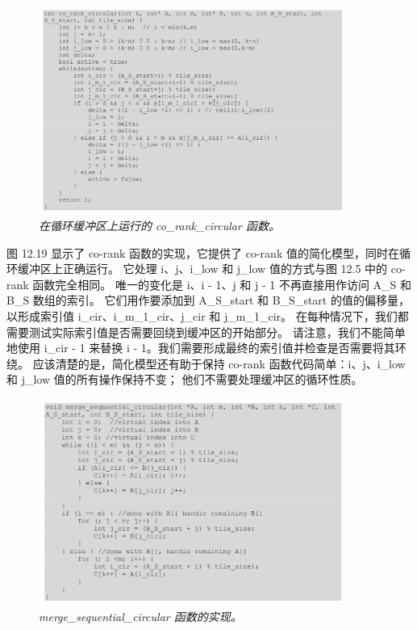 \begin{figure}[H]
	\centering
	\includegraphics[width=0.9\textwidth]{figs/F12.19.png}
	\caption{\textit{在循环缓冲区上运行的 co\_rank\_circular 函数。}}
\end{figure}

图 12.19 显示了 co-rank 函数的实现，它提供了 co-rank 值的简化模型，同时在循环缓冲区上正确运行。 
它处理 i、j、i\_low 和 j\_low 值的方式与图 12.5 中的 co-rank 函数完全相同。 
唯一的变化是 i、i - 1、j 和 j - 1 不再直接用作访问 A\_S 和 B\_S 数组的索引。 
它们用作要添加到 A\_S\_start 和 B\_S\_start 的值的偏移量，
以形成索引值 i\_cir、i\_m\_1\_cir、j\_cir 和 j\_m\_1\_cir。 
在每种情况下，我们都需要测试实际索引值是否需要回绕到缓冲区的开始部分。 
请注意，我们不能简单地使用 i\_cir - 1 来替换 i - 1。我们需要形成最终的索引值并检查是否需要将其环绕。 
应该清楚的是，简化模型还有助于保持 co-rank 函数代码简单：i、j、i\_low 和 j\_low 值的所有操作保持不变； 
他们不需要处理缓冲区的循环性质。

\begin{figure}[H]
	\centering
	\includegraphics[width=0.9\textwidth]{figs/F12.20.png}
	\caption{\textit{merge\_sequential\_circular 函数的实现。}}
\end{figure}

